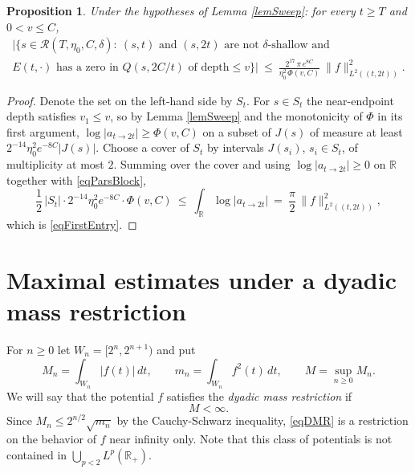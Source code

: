 \documentclass[11pt,twoside,reqno]{amsart}
\def\to{\rightarrow}
\def\R{{\mathbb R}}
\def\RR{{\mathcal{R}}}
\def\d{\delta}
\theoremstyle{plain}
\newtheorem{proposition}{Proposition}
\numberwithin{equation}{section}
\begin{document}
\begin{proposition}\label{propFirstEntry}
Under the hypotheses of Lemma \ref{lemSweep}: for every $t\geq T$ and $0<v\leq C$,
\begin{equation}
\begin{gathered}\big|\big\{s\in\RR(T,\eta_0,C,\d):\ (s,t)\text{ and }(s,2t)\text{ are not $\d$-shallow and}\\
E(t,\cdot)\text{ has a zero in }Q(s,2C/t)\text{ of depth}\leq v\big\}\big|\ \leq\
\frac{2^{17}\,\pi\,e^{8C}}{\eta_0^{2}\,\Phi(v,C)}\ \|f\|^2_{L^2((t,2t))}.\end{gathered}
\label{eqFirstEntry}
\end{equation}
\end{proposition}

\begin{proof}
Denote the set on the left-hand side by $S_t$. For $s\in S_t$ the near-endpoint depth satisfies $v_1\leq v$, so by Lemma \ref{lemSweep} and the monotonicity of $\Phi$ in its first argument, $\log|a_{t\to2t}|\geq\Phi(v,C)$ on a subset of $J(s)$ of measure at least $2^{-14}\eta_0^2e^{-8C}|J(s)|$. Choose a cover of $S_t$ by intervals $J(s_i)$, $s_i\in S_t$, of multiplicity at most $2$. Summing over the cover and using $\log|a_{t\to2t}|\geq0$ on $\R$ together with \eqref{eqParsBlock},
$$\frac12\,|S_t|\cdot 2^{-14}\eta_0^2e^{-8C}\cdot\Phi(v,C)\ \leq\ \int_\R\log|a_{t\to2t}|\ =\ \frac\pi2\,\|f\|^2_{L^2((t,2t))},$$
which is \eqref{eqFirstEntry}.
\end{proof}

\section{Maximal estimates under a dyadic mass restriction}\label{secMax}

For $n\geq 0$ let $W_n=[2^n,2^{n+1})$ and put
$$M_n=\int_{W_n}|f(t)|\,dt,\qquad m_n=\int_{W_n}f^2(t)\,dt,\qquad M=\sup_{n\geq 0}M_n.$$
We will say that the potential $f$ satisfies the {\it dyadic mass restriction} if
\begin{equation} M<\infty. \label{eqDMR}\end{equation}
Since $M_n\leq 2^{n/2}\sqrt{m_n}$ by the Cauchy-Schwarz inequality, \eqref{eqDMR} is a restriction on the behavior of $f$ near infinity only. Note that this class of potentials is not contained in $\bigcup_{p<2}L^p(\R_+)$.
\end{document}
